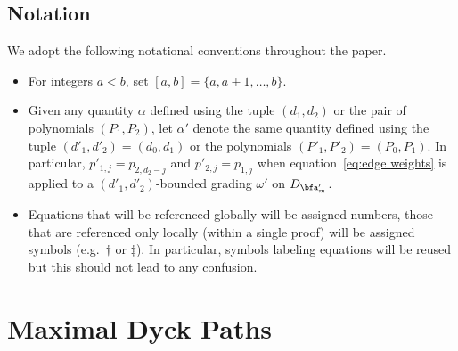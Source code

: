  \subsection*{Notation}
 We adopt the following notational conventions throughout the paper.
 \begin{itemize}
 \item For integers $a<b$, set $[a,b]=\{a,a+1,\ldots,b\}$.
 \item Given any quantity $\alpha$ defined using the tuple $(d_1,d_2)$ or the pair of polynomials $(P_1,P_2)$, let $\alpha'$ denote the same quantity defined using the tuple $(d'_1,d'_2)=(d_0,d_1)$ or the polynomials $(P'_1,P'_2)=(P_0,P_1)$. 
 In particular, $p'_{1,j}=p_{2,d_2-j}$ and $p'_{2,j}=p_{1,j}$ when equation~\eqref{eq:edge weights} is applied to a $(d'_1,d'_2)$-bounded grading $\omega'$ on $D_{\bfa'_m}$.
 \item Equations that will be referenced globally will be assigned numbers, those that are referenced only locally (\ie within a single proof) will be assigned symbols (e.g.\ $\dagger$ or $\ddagger$). 
 In particular, symbols labeling equations will be reused but this should not lead to any confusion. 
 \end{itemize}


\section{Maximal Dyck Paths}
\label{sec:dyck paths}

